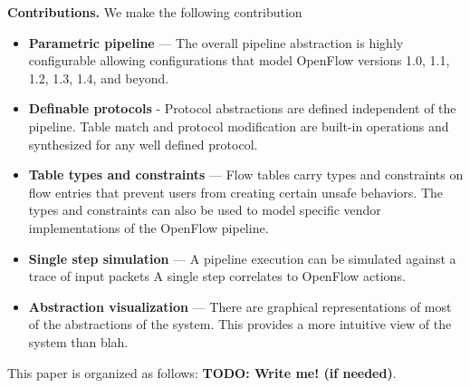\textbf{Contributions.} We make the following contribution
\begin{itemize}
  \item \textbf{Parametric pipeline} --- The overall pipeline abstraction is
        highly configurable allowing configurations that model OpenFlow 
        versions 1.0, 1.1, 1.2, 1.3, 1.4, and beyond.
  \item \textbf{Definable protocols} - Protocol abstractions are defined 
        independent of the pipeline. Table match and protocol modification are
        built-in operations and synthesized for any well defined protocol.
  \item \textbf{Table types and constraints} --- Flow tables carry types and
        constraints on flow entries that prevent users from creating certain
        unsafe behaviors. The types and constraints can also be used to model
        specific vendor implementations of the OpenFlow pipeline.
  \item \textbf{Single step simulation} --- A pipeline execution can be simulated
        against a trace of input packets A single step correlates to OpenFlow
        actions.
  \item \textbf{Abstraction visualization} --- There are graphical representations
        of most of the abstractions of the system. This provides a more intuitive
        view of the system than blah.
\end{itemize}

This paper is organized as follows: \textbf{TODO: Write me! (if needed)}.
